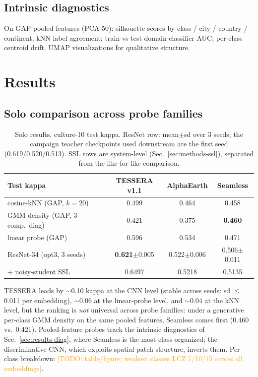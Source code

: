 \documentclass[11pt]{article}
\newcommand{\todo}[1]{\textcolor{orange}{[TODO: #1]}}
\begin{document}
\subsection{Intrinsic diagnostics}\label{sec:methods-diag}
On GAP-pooled features (PCA-50): silhouette scores by class /
city / country / continent; kNN label agreement; train-vs-test
domain-classifier AUC; per-class centroid drift. UMAP visualizations
for qualitative structure.

\section{Results}\label{sec:results}

\subsection{Solo comparison across probe families}
\label{sec:results-solo}
\begin{table}[h]
\centering\small
\begin{tabular}{lccc}
\toprule
Test kappa & TESSERA v1.1 & AlphaEarth & Seamless\\
\midrule
cosine-kNN (GAP, $k{=}20$) & 0.499 & 0.464 & 0.458\\
GMM density (GAP, 3 comp.\ diag) & 0.421 & 0.375 & \textbf{0.460}\\
linear probe (GAP) & 0.596 & 0.534 & 0.471\\
ResNet-34 (opt3, 3 seeds) & \textbf{0.621}$\pm$0.005 & 0.522$\pm$0.006 & 0.506$\pm$0.011\\
\quad + noisy-student SSL & 0.6497 & 0.5218 & 0.5135\\
\bottomrule
\end{tabular}
\caption{Solo results, culture-10 test kappa. ResNet row:
mean$\pm$sd over 3 seeds; the campaign teacher checkpoints used
downstream are the first seed (0.619/0.520/0.513). SSL rows are
system-level (Sec.~\ref{sec:methods-ssl}), separated from the
like-for-like comparison.}
\label{tab:solo}
\end{table}

TESSERA leads by $\sim$0.10 kappa at the CNN level (stable across
seeds: sd $\leq$ 0.011 per embedding), $\sim$0.06 at the linear-probe
level, and $\sim$0.04 at the kNN level, but the ranking is \emph{not}
universal across
probe families: under a generative per-class GMM density on the same
pooled features, Seamless comes first (0.460 vs.\ 0.421).
Pooled-feature probes track the intrinsic diagnostics of
Sec.~\ref{sec:results-diag}, where Seamless is the most
class-organized; the discriminative CNN, which exploits spatial patch
structure, inverts them. Per-class breakdown:
\todo{table/figure; weakest classes LCZ 7/10/15 across all
embeddings}.
\end{document}
